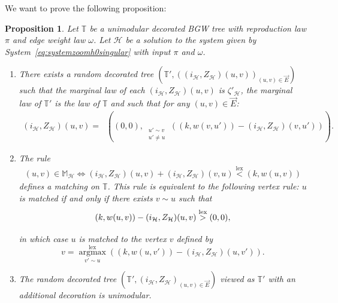 \documentclass[11pt]{article}
\DeclareMathOperator{\lex}{lex}
\DeclareMathOperator*{\argmax}{argmax}
\DeclareMathOperator*{\maxlex}{\overset{\lex}{\max}}
\newtheorem{prop}{Proposition}[section]
\begin{document}
We want to prove the following proposition:
\begin{prop}\label{prop:Zconstruction}
    Let $\mathbb{T}$ be a unimodular decorated BGW tree with reproduction law $\pi$ and edge weight law $\omega$. Let $\mathcal{H}$ be a solution to the system given by System~\eqref{eq:systemzoomh0singular} with input $\pi$ and $\omega$.
    \begin{enumerate}[label=\roman*)]
        \item There exists a random decorated tree $(\mathbb{T}',((i_{\mathcal{H}},Z_{\mathcal{H}})(u,v))_{(u,v) \in \overset{\rightarrow}{E}})$ such that the marginal law of each $(i_{\mathcal{H}},Z_{\mathcal{H}})(u,v)$ is $\zeta'_{\mathcal{H}}$, the marginal law of $\mathbb{T}'$ is the law of $\mathbb{T}$ and such that for any $(u,v) \in \overset{\rightarrow}{E}$:
        \begin{equation}\label{eq:systemrecursionzoombis}
    \begin{aligned}
        (i_{\mathcal{H}},Z_{\mathcal{H}})(u,v)=\maxlex\left( (0,0) , \maxlex_{\substack{ u' \sim v \\ u' \neq u}}\left( (k,w(v,u'))-(i_{\mathcal{H}},Z_{\mathcal{H}})(v,u') \right) \right).
    \end{aligned}
\end{equation}
        \item The rule
        \begin{align}\label{eq:decisionrule}
            (u,v) \in \mathbb{M}_{\mathcal{H}} \Leftrightarrow (i_{\mathcal{H}},Z_{\mathcal{H}})(u,v)+(i_{\mathcal{H}},Z_{\mathcal{H}})(v,u)\overset{\lex}{<} (k,w(u,v)) 
        \end{align}
        defines a matching on $\mathbb{T}$. This rule is equivalent to the following vertex rule:
        $u$ is matched if and only if there exists $v\sim u$ such that
\begin{equation}\label{eq:vertexrulebis}
        \vphantom{\underset{v' \sim u}{\overset{\lex}{\argmax}}}
        (k,w(u,v))-(i_{\mathcal{H}},Z_{\mathcal{H}})(u,v) \overset{\lex}{>} (0,0),
\end{equation}
in which case $u$ is matched to the vertex $v$ defined by
\begin{equation}
        v=\underset{v' \sim u}{\overset{\lex}{\argmax}} \left( (k,w(u,v'))-(i_{\mathcal{H}},Z_{\mathcal{H}})(u,v') \right).
\end{equation}

        \item The random decorated tree $(\mathbb{T}', (i_{\mathcal{H}},Z_{\mathcal{H}})_{(u,v) \in \overset{\rightarrow}{E}})$ viewed as $\mathbb{T}'$ with an additional decoration is unimodular.
        \end{enumerate}
\end{prop}
\end{document}

